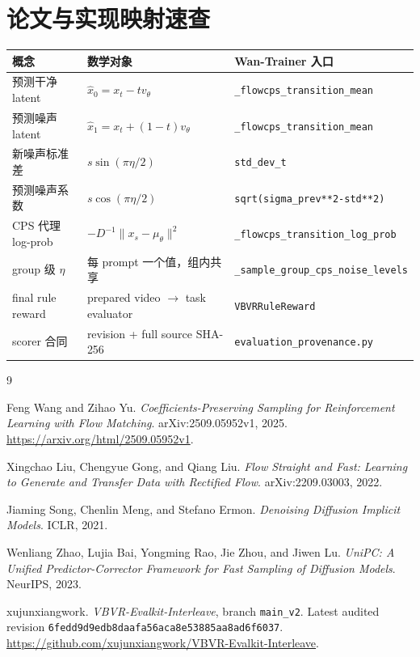 \documentclass[11pt,a4paper]{article}
\newcommand{\code}[1]{\texttt{#1}}
\begin{document}
\section{论文与实现映射速查}

\begin{table}[htbp]
  \centering
  \small
  \begin{tabularx}{\textwidth}{p{3.3cm}p{5.1cm}X}
    \toprule
    概念 & 数学对象 & Wan-Trainer 入口\\
    \midrule
    预测干净 latent
      & $\widehat{x}_0=x_t-t v_\theta$
      & \code{\_flowcps\_transition\_mean}\\
    预测噪声 latent
      & $\widehat{x}_1=x_t+(1-t)v_\theta$
      & \code{\_flowcps\_transition\_mean}\\
    新噪声标准差
      & $s\sin(\pi\eta/2)$
      & \code{std\_dev\_t}\\
    预测噪声系数
      & $s\cos(\pi\eta/2)$
      & \code{sqrt(sigma\_prev**2-std**2)}\\
    CPS 代理 log-prob
      & $-D^{-1}\|x_s-\mu_\theta\|^2$
      & \code{\_flowcps\_transition\_log\_prob}\\
    group 级 $\eta$
      & 每 prompt 一个值，组内共享
      & \code{\_sample\_group\_cps\_noise\_levels}\\
    final rule reward
      & prepared video $\rightarrow$ task evaluator
      & \code{VBVRRuleReward}\\
    scorer 合同
      & revision + full source SHA-256
      & \code{evaluation\_provenance.py}\\
    \bottomrule
  \end{tabularx}
\end{table}

\begin{thebibliography}{9}

Feng Wang and Zihao Yu.
\newblock \emph{Coefficients-Preserving Sampling for Reinforcement Learning with Flow Matching}.
\newblock arXiv:2509.05952v1, 2025.
\newblock \url{https://arxiv.org/html/2509.05952v1}.

Xingchao Liu, Chengyue Gong, and Qiang Liu.
\newblock \emph{Flow Straight and Fast: Learning to Generate and Transfer Data with Rectified Flow}.
\newblock arXiv:2209.03003, 2022.

Jiaming Song, Chenlin Meng, and Stefano Ermon.
\newblock \emph{Denoising Diffusion Implicit Models}.
\newblock ICLR, 2021.

Wenliang Zhao, Lujia Bai, Yongming Rao, Jie Zhou, and Jiwen Lu.
\newblock \emph{UniPC: A Unified Predictor-Corrector Framework for Fast Sampling of Diffusion Models}.
\newblock NeurIPS, 2023.

xujunxiangwork.
\newblock \emph{VBVR-Evalkit-Interleave}, branch \code{main\_v2}.
\newblock Latest audited revision
\code{6fedd9d9edb8daafa56aca8e53885aa8ad6f6037}.
\newblock \url{https://github.com/xujunxiangwork/VBVR-Evalkit-Interleave}.

\end{thebibliography}
\end{document}
